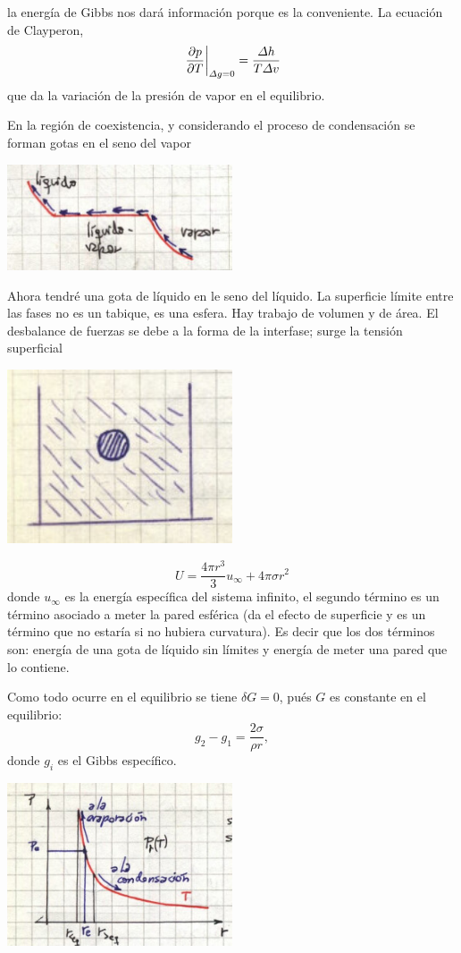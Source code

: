 \documentclass[10pt,oneside]{CBFT_book}
\begin{document}
la energía de Gibbs nos dará información porque es la conveniente.
La ecuación de Clayperon,
\[
	\left.\frac{\partial^{\hspace{-0.05em}} {p}}{\partial {T}^{\hspace{-0.05em}}}\right|_{\Delta g=0} = \frac{\Delta h}{T \Delta v}
\]
que da la variación de la presión de vapor en el equilibrio.

En la región de coexistencia, y considerando el proceso de condensación se forman
gotas en el seno del vapor

\includegraphics[width=0.50\textwidth]{images/1606329052.jpg}

Ahora tendré una gota de líquido en le seno del líquido. La superficie límite entre las fases
no es un tabique, es una esfera.
Hay trabajo de volumen y de área. El desbalance de fuerzas se debe a la forma de la interfase;
surge la tensión superficial

\includegraphics[width=0.50\textwidth]{images/1606329057.jpg}

\[
	U = \frac{4 \pi r^3 }{3} u_\infty + 4 \pi \sigma r^2
\]
donde $u_\infty$ es la energía específica del sistema infinito, el segundo término es un término
asociado a meter la pared esférica (da el efecto de superficie y es un término que no estaría
si no hubiera curvatura). Es decir que los dos términos son: energía de una gota de líquido
sin límites y energía de meter una pared que lo contiene.

Como todo ocurre en el equilibrio se tiene $\delta G=0$, pués $G$ es constante en el equilibrio:
\[
	g_2 - g_1 = \frac{2 \sigma}{\rho r},
\]
donde $g_i$ es el Gibbs específico.

\includegraphics[width=0.50\textwidth]{images/1606329061.jpg}
\end{document}
